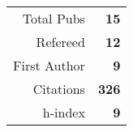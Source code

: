 \begin{table}\begin{tabular}{rr}Total Pubs & \textbf{15}\\Refereed & \textbf{12}\\First Author & \textbf{9}\\Citations & \quad \textbf{326}\\h-index & \textbf{9}\end{tabular}\end{table}